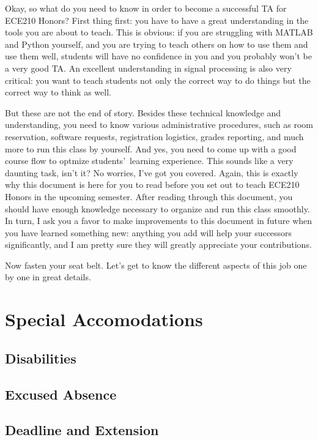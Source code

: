\documentclass[12pt]{article}
\begin{document}
    Okay, so what do you need to know in order to become a successful TA for ECE210 Honors? First thing first: you have to have a great understanding in the tools you are about to teach. This is obvious: if you are struggling with MATLAB and Python yourself, and you are trying to teach others on how to use them and use them well, students will have no confidence in you and you probably won\rq t be a very good TA. An excellent understanding in signal processing is also very critical: you want to teach students not only the correct way to do things but the correct way to think as well.
    
    But these are not the end of story. Besides these technical knowledge and understanding, you need to know various administrative procedures, such as room reservation, software requests, registration logistics, grades reporting, and much more to run this class by yourself. And yes, you need to come up with a good course flow to optmize students\rq \
     learning experience. This sounds like a very daunting task, isn\rq t it? No worries, I\rq ve got you covered. Again, this is exactly why this document is here for you to read before you set out to teach ECE210 Honors in the upcoming semester. After reading through this document, you should have enough knowledge necessary to organize and run this class smoothly. In turn, I ask you a favor to make improvements to this document in future when you have learned something new: anything you add will help your successors significantly, and I am pretty sure they will greatly appreciate your contributions.

    Now fasten your seat belt. Let\rq s get to know the different aspects of this job one by one in great details.
\newpage

\section{Special Accomodations}
    \subsection{Disabilities}
    \subsection{Excused Absence}
    \subsection{Deadline and Extension}
\newpage
\end{document}
